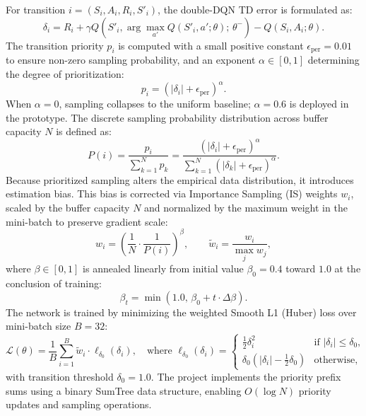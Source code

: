 \documentclass[12pt,a4paper,oneside]{report}
\begin{document}
For transition $i = (S_i, A_i, R_i, S'_{i})$, the double-DQN TD error is formulated as:
\begin{equation}
\label{eq:td_error}
\delta_i = R_i + \gamma Q\left(S'_{i}, \arg\max_{a'} Q(S'_{i}, a'; \theta); \, \theta^-\right) - Q(S_i, A_i; \theta).
\end{equation}
The transition priority $p_i$ is computed with a small positive constant $\epsilon_{\text{per}} = 0.01$ to ensure non-zero sampling probability, and an exponent $\alpha \in [0, 1]$ determining the degree of prioritization:
\begin{equation}
\label{eq:per_priority}
p_i = \left( |\delta_i| + \epsilon_{\text{per}} \right)^\alpha.
\end{equation}
When $\alpha = 0$, sampling collapses to the uniform baseline; $\alpha = 0.6$ is deployed in the prototype. The discrete sampling probability distribution across buffer capacity $N$ is defined as:
\begin{equation}
\label{eq:per_probability}
P(i) = \frac{p_i}{\sum_{k=1}^N p_k} = \frac{(|\delta_i| + \epsilon_{\text{per}})^\alpha}{\sum_{k=1}^N (|\delta_k| + \epsilon_{\text{per}})^\alpha}.
\end{equation}
Because prioritized sampling alters the empirical data distribution, it introduces estimation bias. This bias is corrected via Importance Sampling (IS) weights $w_i$, scaled by the buffer capacity $N$ and normalized by the maximum weight in the mini-batch to preserve gradient scale:
\begin{equation}
\label{eq:is_weights}
w_i = \left( \frac{1}{N} \cdot \frac{1}{P(i)} \right)^\beta, \qquad \tilde{w}_i = \frac{w_i}{\max_{j} w_j},
\end{equation}
where $\beta \in [0, 1]$ is annealed linearly from initial value $\beta_0 = 0.4$ toward $1.0$ at the conclusion of training:
\begin{equation}
\label{eq:beta_anneal}
\beta_t = \min\left(1.0, \, \beta_0 + t \cdot \Delta\beta \right).
\end{equation}
The network is trained by minimizing the weighted Smooth L1 (Huber) loss over mini-batch size $B = 32$:
\begin{equation}
\label{eq:weighted_huber_loss}
\mathcal{L}(\theta) = \frac{1}{B} \sum_{i=1}^B \tilde{w}_i \cdot \ell_{\delta_0}(\delta_i), \quad \text{where } \ell_{\delta_0}(\delta_i) = \begin{cases} \frac{1}{2}\delta_i^2 & \text{if } |\delta_i| \le \delta_0, \\[1mm] \delta_0 \left( |\delta_i| - \frac{1}{2}\delta_0 \right) & \text{otherwise}, \end{cases}
\end{equation}
with transition threshold $\delta_0 = 1.0$. The project implements the priority prefix sums using a binary SumTree data structure, enabling $O(\log N)$ priority updates and sampling operations.
\end{document}

